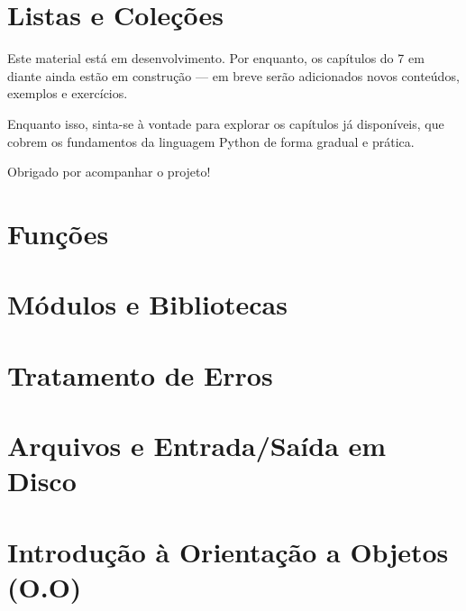 \documentclass[12pt]{book}
\begin{document}
	\chapter{Listas e Coleções}
	
	\begin{tcolorbox}[colback=yellow!10, colframe=black, title={\large\bfseries Nota ao leitor}]
		Este material está em desenvolvimento. Por enquanto, os capítulos do 7 em diante ainda estão em construção — em breve serão adicionados novos conteúdos, exemplos e exercícios.
		
		Enquanto isso, sinta-se à vontade para explorar os capítulos já disponíveis, que cobrem os fundamentos da linguagem Python de forma gradual e prática.
		
		Obrigado por acompanhar o projeto!
	\end{tcolorbox}
	
	
	\chapter{Funções}
	
	\chapter{Módulos e Bibliotecas}
	
	\chapter{Tratamento de Erros}
	
	\chapter{Arquivos e Entrada/Saída em Disco}
	
	\chapter{Introdução à Orientação a Objetos (O.O)}
	
\end{document}
